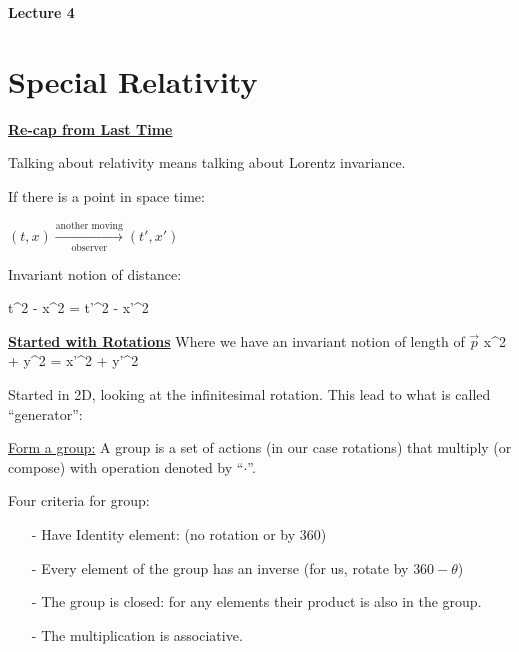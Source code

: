 
\usepackage{fancyhdr}

\fancyhf{}


\thispagestyle{fancy}

\begin{center}
{\huge \textbf{Lecture 4}}
\end{center}

{\fontsize{14}{16}\selectfont


\section*{Special Relativity}

\underline{\textbf{Re-cap from Last Time}}

Talking about relativity means talking about Lorentz invariance.

If there is a point in space time: \\
\begin{center}
$(t,x) \xrightarrow[\text{observer}]{\text{another moving}} (t', x')$
\end{center}

Invariant notion of distance:
 
\be
t^2 - x^2 = t'^2 - x'^2
\ee

\underline{\textbf{Started with Rotations}}
Where we have an invariant notion of length of $\vec{p}$
\be
x^2 + y^2 = x'^2 + y'^2
\ee

Started in 2D, looking at the infinitesimal rotation.
This lead to what is called ``generator'':

\begin{center}
\IMatrix
\end{center}

\underline{Form a group:}
A group is a set of actions (in our case rotations) that multiply (or compose) with operation denoted by ``$\cdot$''.

Four criteria for group:
\begin{itemize}
\item[-] Have Identity element:  (no rotation or by 360)
\item[-] Every element of the group has an inverse (for us, rotate by $360-\theta$)
\item[-] The group is closed:  for any elements their product is also in the group.
\item[-] The multiplication is associative.
\end{itemize}

}
